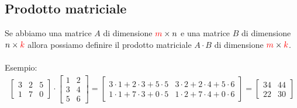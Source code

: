 \documentclass[italian]{article}
\begin{document}
\subsection{Prodotto matriciale}
Se abbiamo una matrice $A$ di dimensione $\textcolor{red}{m} \times n$ e una matrice $B$ di dimensione $n \times \textcolor{red}{k}$ allora possiamo definire il prodotto matriciale $A\cdot B$ di dimensione $\textcolor{red}{m} \times \textcolor{red}{k}$.\\\\
Esempio:
\begin{gather*}
	\begin{bmatrix}
		3 & 2 & 5 \\
		1 & 7 & 0
	\end{bmatrix}
	\cdot
	\begin{bmatrix}
		1 & 2 \\
		3 & 4 \\
		5 & 6
	\end{bmatrix}
	=
	\begin{bmatrix}
		3\cdot 1 + 2 \cdot 3 + 5 \cdot 5 & 3\cdot 2 + 2 \cdot 4 + 5 \cdot 6 \\
		1\cdot 1 + 7 \cdot 3 + 0 \cdot 5 & 1\cdot 2 + 7 \cdot 4 + 0 \cdot 6
	\end{bmatrix}
	=
	\begin{bmatrix}
		34 & 44 \\
		22 & 30
	\end{bmatrix}
\end{gather*}
\end{document}
